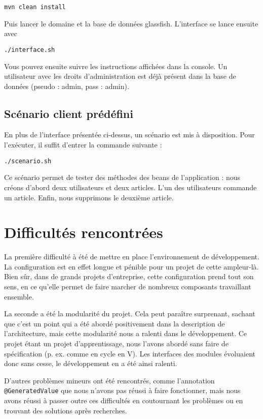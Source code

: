 \documentclass[12pt]{article}
\begin{document}
    \texttt{mvn clean install}

    Puis lancer le domaine et la base de données glassfish. L'interface se lance ensuite avec

    \texttt{./interface.sh}

    Vous pouvez ensuite suivre les instructions affichées dans la console. Un utilisateur avec les droits d'administration est déjà présent dans la base de données (pseudo : admin, pass : admin).

    \subsection{Scénario client prédéfini}
    En plus de l'interface présentée ci-dessus, un scénario est mis à disposition. Pour l'exécuter, il suffit d'entrer la commande suivante :

    \texttt{./scenario.sh}

    Ce scénario permet de tester des méthodes des beans de l'application : nous créons d'abord deux utilisateurs et deux articles. L'un des utilisateurs commande un article. Enfin, nous supprimons le deuxième article.

\newpage
\section{Difficultés rencontrées}

La première difficulté à été de mettre en place l'environnement de développement.
La configuration est en effet longue et pénible pour un projet de cette ampleur-là.
Bien sûr, dans de grands projets d'entreprise, cette configuration prend tout son sens, en ce qu'elle permet de faire marcher de nombreux composants travaillant ensemble.

La seconde a été la modularité du projet.
Cela peut paraître surprenant, sachant que c'est un point qui a été abordé positivement dans la description de l'architecture, mais cette modularité nous a ralenti dans le développement.
Ce projet étant un projet d'apprentissage, nous l'avons abordé sans faire de spécification (p. ex. comme en cycle en V).
Les interfaces des modules évoluaient donc sans cesse, le développement en a été ainsi ralenti.

D'autres problèmes mineurs ont été rencontrés, comme l'annotation \texttt{@GeneratedValue} que nous n'avons pas réussi à faire fonctionner, mais nous avons réussi à passer outre ces difficultés en coutournant les problèmes ou en trouvant des solutions après recherches.
\end{document}
